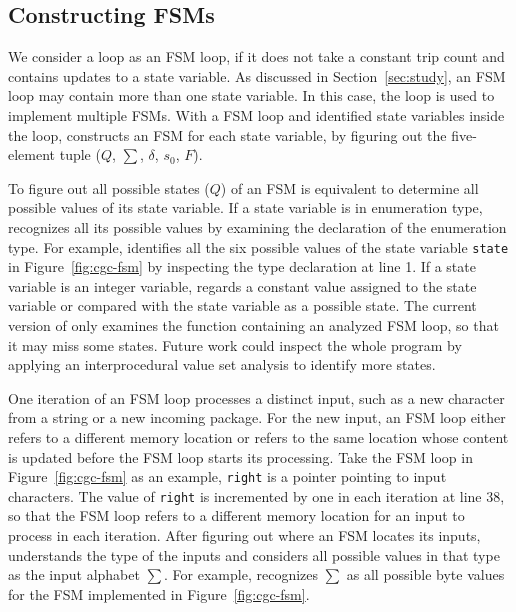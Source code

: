 \vspace{-0.1in}

\subsection{Constructing FSMs}
\label{sec:tuple}
We consider a loop as an FSM loop, if it does not take a constant trip count 
and contains updates to a state variable.
As discussed in Section~\ref{sec:study}, 
an FSM loop may contain more than one state variable. 
In this case, the loop is used to implement multiple FSMs.
With a FSM loop and identified state variables inside the loop, 
\Tool{} constructs an FSM for each state variable, 
by figuring out the five-element 
tuple ($Q$, $\sum$, $\delta$, $s_0$, $F$). 

To figure out all possible states ($Q$) of an FSM 
is equivalent to determine all possible values of its state variable. 
If a state variable is in enumeration type, 
\Tool{} recognizes all its possible values 
by examining the declaration of the enumeration type. 
For example, \Tool{} identifies all the six possible values of 
the state variable \texttt{state} in Figure~\ref{fig:cgc-fsm} 
by inspecting the type declaration at line 1. 
If a state variable is an integer variable, \Tool{} regards 
a constant value assigned to the state variable or 
compared with the state variable as a possible state. 
The current version of \Tool{} only examines the function
containing an analyzed FSM loop, so that it may miss some states. 
Future work could inspect the whole program by 
applying an interprocedural 
value set analysis to identify more states. 

One iteration of an FSM loop processes a distinct input, 
such as a new character from a string or a new incoming package. 
For the new input, an FSM loop either refers to a different memory location 
or refers to the same location whose content is updated before 
the FSM loop starts its processing. 
Take the FSM loop in Figure~\ref{fig:cgc-fsm} as an example, 
\texttt{right} is a pointer pointing to input characters.
The value of \texttt{right} is incremented by one in each iteration at line 38, 
so that the FSM loop refers to a different memory location 
for an input to process in each iteration.  
After figuring out where an FSM locates its inputs, 
\Tool{} understands the type of the inputs 
and considers all possible values in that type
as the input alphabet $\sum$. For example, \Tool{} recognizes 
$\sum$ as all possible byte values 
for the FSM implemented in Figure~\ref{fig:cgc-fsm}. 


